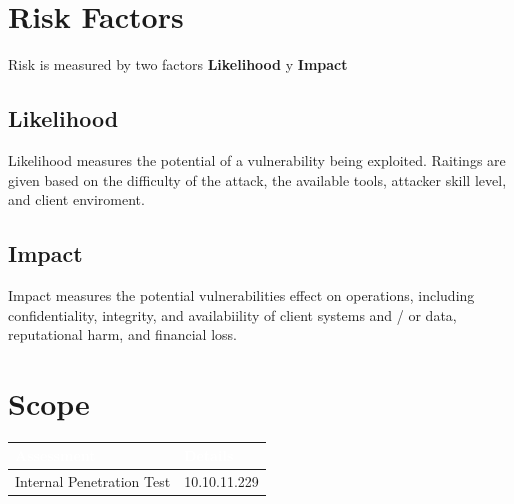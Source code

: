 \documentclass[a4paper]{article} %
\begin{document}
    \section{Risk Factors}
    Risk is measured by two factors \textbf{Likelihood} y \textbf{Impact}
    
    \subsection{Likelihood}
    Likelihood measures the potential of a vulnerability being exploited. Raitings are given based on the difficulty of the attack, the available tools, attacker skill level, and client enviroment.

    \subsection{Impact}
    Impact measures the potential vulnerabilities effect on operations, including confidentiality, integrity, and availabiility of client systems and / or data, reputational harm, and financial loss.
    


    \clearpage

    \section{Scope} %
    \begin{table}[htbp]
        \begin{tabularx}{\textwidth}{|X|X|}
            \hline
            \rowcolor{blueColor}
            \textbf{\textcolor{white}{Assessment}} & \textbf{\textcolor{white}{Details}} \\
            \hline
            {Internal Penetration Test} & {10.10.11.229} \\
            \hline
        \end{tabularx}
    \end{table}
\end{document}
